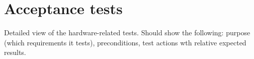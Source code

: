 \section{Acceptance tests}\label{sec:test_trace}

Detailed view of the hardware-related tests.
Should show the following: purpose (which requirements it tests), preconditions, test actions wth relative expected results.
